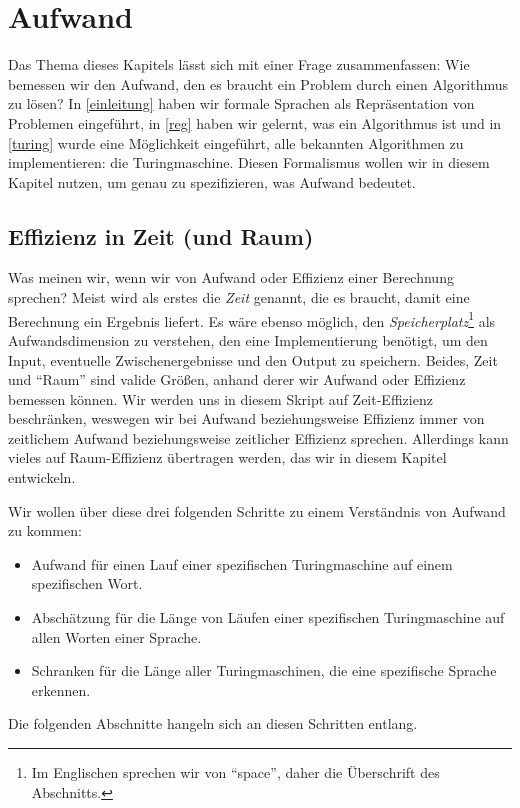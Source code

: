 \chapter{Aufwand}
Das Thema dieses Kapitels lässt sich mit einer Frage zusammenfassen:
Wie bemessen wir den Aufwand,
den es braucht ein Problem durch einen Algorithmus zu lösen?
In \autoref{einleitung} haben wir formale Sprachen als Repräsentation von Problemen eingeführt,
in \autoref{reg} haben wir gelernt, was ein Algorithmus ist und
in \autoref{turing} wurde eine Möglichkeit eingeführt,
alle bekannten Algorithmen zu implementieren:
die Turingmaschine.
Diesen Formalismus wollen wir in diesem Kapitel nutzen,
um genau zu spezifizieren,
was Aufwand bedeutet.

\section{Effizienz in Zeit (und Raum)}

Was meinen wir, wenn wir von Aufwand oder Effizienz einer Berechnung sprechen?
Meist wird als erstes die \emph{Zeit} genannt,
die es braucht,
damit eine Berechnung ein Ergebnis liefert.
Es wäre ebenso möglich,
den \emph{Speicherplatz}\footnote{
    Im Englischen sprechen wir von ``space'', daher die Überschrift des Abschnitts.}
als Aufwandsdimension zu verstehen,
den eine Implementierung benötigt,
um den Input,
eventuelle Zwischenergebnisse
und den Output zu speichern.
Beides, Zeit und ``Raum'' sind valide Größen,
anhand derer wir Aufwand oder Effizienz bemessen können.
Wir werden uns in diesem Skript auf Zeit-Effizienz beschränken,
weswegen wir bei Aufwand beziehungsweise Effizienz immer von
zeitlichem Aufwand beziehungsweise zeitlicher Effizienz sprechen.
Allerdings kann vieles auf Raum-Effizienz übertragen werden,
das wir in diesem Kapitel entwickeln.

Wir wollen über diese drei folgenden Schritte zu einem Verständnis von Aufwand zu kommen:
\begin{itemize}
    \item Aufwand für einen Lauf einer spezifischen Turingmaschine auf einem spezifischen Wort.
    \item Abschätzung für die Länge von Läufen einer spezifischen Turingmaschine
        auf allen Worten einer Sprache.
    \item Schranken für die Länge aller Turingmaschinen, die eine spezifische Sprache erkennen.
\end{itemize}

Die folgenden Abschnitte hangeln sich an diesen Schritten entlang.

